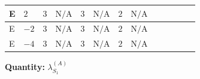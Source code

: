 \documentclass[8pt]{article}
\begin{document}
\begin{landscape}
\begin{longtable}{@{}llcccccc >{\raggedright\arraybackslash}p{0.21\linewidth} >{\raggedright\arraybackslash}p{0.21\linewidth} >{\raggedright\arraybackslash}p{0.21\linewidth}@{}}
\midrule
E & $2$ & $3$ & $\text{N/A}$ & $3$ & $\text{N/A}$ & $2$ & $\text{N/A}$ & \scriptsize\adjustbox{max width=\linewidth}{$\begin{gathered} +3 {\lambda_{HS_1}^{(A)}}^2\end{gathered}$} & \scriptsize\adjustbox{max width=\linewidth}{$\begin{gathered} +12 {\lambda_{S_1}^{(1)}} {\lambda_{S_1}^{(A)}}\end{gathered}$} & \scriptsize\adjustbox{max width=\linewidth}{$\begin{gathered} +20 {\lambda_{S_1}^{(A)}}^2\end{gathered}$} \\
\midrule
E & $-2$ & $3$ & $\text{N/A}$ & $3$ & $\text{N/A}$ & $2$ & $\text{N/A}$ & \scriptsize\adjustbox{max width=\linewidth}{$\begin{gathered} +3 {\lambda_{HS_1}^{(A)}}^2\end{gathered}$} & \scriptsize\adjustbox{max width=\linewidth}{$\begin{gathered} +12 {\lambda_{S_1}^{(1)}} {\lambda_{S_1}^{(A)}}\end{gathered}$} & \scriptsize\adjustbox{max width=\linewidth}{$\begin{gathered} +20 {\lambda_{S_1}^{(A)}}^2\end{gathered}$} \\
\midrule
E & $-4$ & $3$ & $\text{N/A}$ & $3$ & $\text{N/A}$ & $2$ & $\text{N/A}$ & \scriptsize\adjustbox{max width=\linewidth}{$\begin{gathered} +3 {\lambda_{HS_1}^{(A)}}^2\end{gathered}$} & \scriptsize\adjustbox{max width=\linewidth}{$\begin{gathered} +12 {\lambda_{S_1}^{(1)}} {\lambda_{S_1}^{(A)}}\end{gathered}$} & \scriptsize\adjustbox{max width=\linewidth}{$\begin{gathered} +20 {\lambda_{S_1}^{(A)}}^2\end{gathered}$} \\
\midrule
\bottomrule
\end{longtable}
\clearpage
\noindent\textbf{Quantity: }$\lambda_{S_1}^{(A)}$\par\smallskip

\end{landscape}
\end{document}
